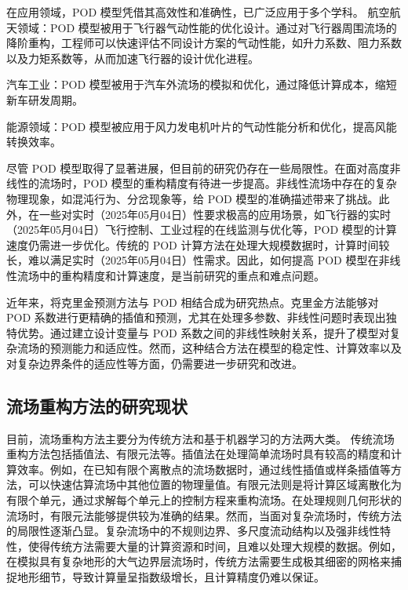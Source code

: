在应用领域，POD 模型凭借其高效性和准确性，已广泛应用于多个学科。
 航空航天领域：POD 模型被用于飞行器气动性能的优化设计\cite{LeGresley2006}。通过对飞行器周围流场的降阶重构，工程师可以快速评估不同设计方案的气动性能，如升力系数、阻力系数以及力矩系数等，从而加速飞行器的设计优化进程。
 
 汽车工业：POD 模型被用于汽车外流场的模拟和优化\cite{Bergmann2018}，通过降低计算成本，缩短新车研发周期。
 
 能源领域：POD 模型被应用于风力发电机叶片的气动性能分析和优化\cite{Couplet2003}，提高风能转换效率。
 
 尽管 POD 模型取得了显著进展，但目前的研究仍存在一些局限性。在面对高度非线性的流场时，POD 模型的重构精度有待进一步提高\cite{Holmes2012}。非线性流场中存在的复杂物理现象，如混沌行为、分岔现象等，给 POD 模型的准确描述带来了挑战\cite{Noack2003}。此外，在一些对实时（2025年05月04日）性要求极高的应用场景，如飞行器的实时（2025年05月04日）飞行控制、工业过程的在线监测与优化等，POD 模型的计算速度仍需进一步优化\cite{Peherstorfer2021}。传统的 POD 计算方法在处理大规模数据时，计算时间较长，难以满足实时（2025年05月04日）性需求。因此，如何提高 POD 模型在非线性流场中的重构精度和计算速度，是当前研究的重点和难点问题\cite{Carlberg2023}。
 
 近年来，将克里金预测方法与 POD 相结合成为研究热点。克里金方法能够对 POD 系数进行更精确的插值和预测，尤其在处理多参数、非线性问题时表现出独特优势。通过建立设计变量与 POD 系数之间的非线性映射关系，提升了模型对复杂流场的预测能力和适应性。然而，这种结合方法在模型的稳定性、计算效率以及对复杂边界条件的适应性等方面，仍需要进一步研究和改进。

\subsection{流场重构方法的研究现状}
目前，流场重构方法主要分为传统方法和基于机器学习的方法两大类。
传统流场重构方法包括插值法、有限元法等。插值法在处理简单流场时具有较高的精度和计算效率\cite{Press2007}。例如，在已知有限个离散点的流场数据时，通过线性插值或样条插值等方法，可以快速估算流场中其他位置的物理量值\cite{Boyd2001}。有限元法则是将计算区域离散化为有限个单元，通过求解每个单元上的控制方程来重构流场\cite{Zienkiewicz2013}。在处理规则几何形状的流场时，有限元法能够提供较为准确的结果\cite{Bathe2014}。然而，当面对复杂流场时，传统方法的局限性逐渐凸显。复杂流场中的不规则边界、多尺度流动结构以及强非线性特性，使得传统方法需要大量的计算资源和时间，且难以处理大规模的数据\cite{Taylor2013}。例如，在模拟具有复杂地形的大气边界层流场时，传统方法需要生成极其细密的网格来捕捉地形细节，导致计算量呈指数级增长，且计算精度仍难以保证\cite{Moin2012}。

